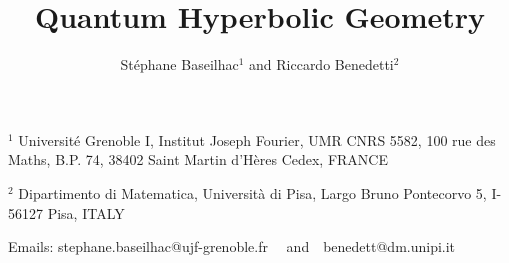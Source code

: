 \documentclass[10pt]{amsart}
\title{Quantum Hyperbolic Geometry}
\author {St\'ephane Baseilhac$^1$ and Riccardo Benedetti$^2$}
\begin{document}
\maketitle

\vspace{0.5cm}

\noindent $^1$ Universit\'e Grenoble I, Institut Joseph Fourier,
UMR CNRS 5582, 100 rue des Maths, B.P. 74, 38402 Saint Martin
d'H\`eres Cedex, FRANCE

\smallskip

\noindent $^2$ Dipartimento di Matematica, Universit\`a di Pisa,
Largo Bruno Pontecorvo 5, I-56127 Pisa, ITALY\medskip

\centerline{Emails: stephane.baseilhac@ujf-grenoble.fr \ \ and\ \
benedett@dm.unipi.it}

\tableofcontents







\end{document}
